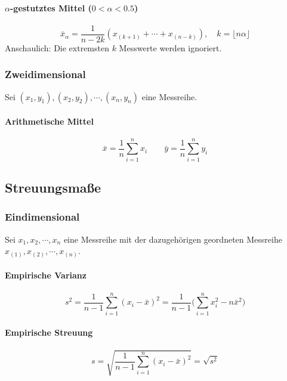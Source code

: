 \paragraph{\(\alpha\)-gestutztes Mittel (\(0 < \alpha < 0.5\))}
	\begin{equation*}
		\bar{x}_\alpha = \frac{1}{n - 2k} (x_{(k+1)} + \cdots + x_{(n-k)}), \quad k = \lfloor n\alpha \rfloor
	\end{equation*}
	Anschaulich: Die extremsten \(k\) Messwerte werden ignoriert.

\subsubsection{Zweidimensional}
	Sei \( (x_1, y_1), (x_2, y_2), \cdots, (x_n, y_n) \) eine Messreihe.

	\paragraph{Arithmetische Mittel}
		\begin{equation*}
			\bar{x} = \frac{1}{n} \sum_{i = 1}^{n} x_i \qquad \bar{y} = \frac{1}{n} \sum_{i = 1}^{n} y_i
		\end{equation*}

\subsection{Streuungsmaße}
\subsubsection{Eindimensional}
Sei \( x_1, x_2, \cdots, x_n \) eine Messreihe mit der dazugehörigen geordneten Messreihe \( x_{(1)}, x_{(2)}, \cdots, x_{(n)} \).

\paragraph{Empirische Varianz}
\begin{equation*}
	s^2 = \frac{1}{n - 1} \sum_{i = 1}^{n} (x_i - \bar{x})^2 = \frac{1}{n - 1} \Bigg( \sum_{i = 1}^{n} x_i^2 - n \bar{x}^2 \Bigg)
\end{equation*}

\paragraph{Empirische Streuung}
\begin{equation*}
	s = \sqrt{\frac{1}{n - 1} \sum_{i = 1}^{n} (x_i - \bar{x})^2} = \sqrt{s^2}
\end{equation*}

